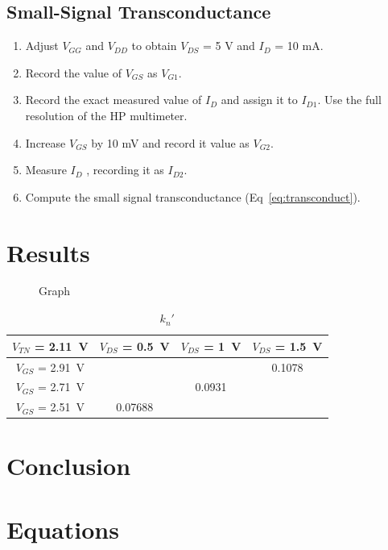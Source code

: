 \subsection{Small-Signal Transconductance}
\label{sec:nand}

\begin{enumerate}
\item Adjust $V_{GG}$ and $V_{DD}$ to obtain $V_{DS}$ = 5 V and $I_D$ = 10 mA.
\item Record the value of $V_{GS}$ as $V_{G1}$.
\item Record the exact measured value of $I_D$ and assign it to $I_{D1}$. Use the full resolution of the HP multimeter.
\item Increase $V_{GS}$ by 10 mV and record it value as $V_{G2}$.
\item Measure $I_D$ , recording it as $I_{D2}$.
\item Compute the small signal transconductance (Eq~\ref{eq:transconduct}).
\end{enumerate}

\section{Results}
\label{sec:results}

\begin{figure}[hbtp]
  \centering
  \resizebox{1.0\textwidth}{!}{}
  \caption{\label{fig:graph} Graph}
\end{figure}

\begin{table}[hbtp]
  \centering
  \begin{tabular}{c|ccc}
    $V_{TN}$ = \SI{2.11}{V} & $V_{DS}$ = \SI{0.5}{V} & $V_{DS}$ = \SI{1}{V} & $V_{DS}$ = \SI{1.5}{V} \\
    \hline
    $V_{GS}$ = \SI{2.91}{V} & & & 0.1078 \\
    $V_{GS}$ = \SI{2.71}{V} & & 0.0931 & \\
    $V_{GS}$ = \SI{2.51}{V} & 0.07688 & & \\
  \end{tabular}
  \caption{\label{tab:kn} $k_n'$}
\end{table}

\section{Conclusion}
\label{sec:conclusion}

\section{Equations}
\label{sec:equations}

